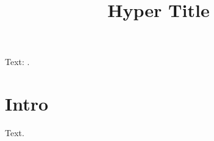 \documentclass{article}
\title{Hyper Title}
\begin{document}
\pdfstringdef\mypdf{\@title}
Text: \mypdf.
\section{Intro}
Text.
\end{document}
